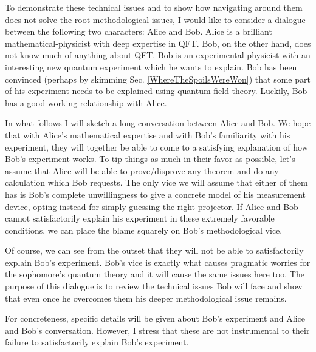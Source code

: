 \documentclass[12pt,prd,superscriptaddress,floatfix,amsmath,amssymb,amsfonts,nofootinbib]{revtex4-2}
\begin{document}
To demonstrate these technical issues and to show how navigating around them does not solve the root methodological issues, I would like to consider a dialogue between the following two characters: Alice and Bob. Alice is a brilliant mathematical-physicist with deep expertise in QFT. Bob, on the other hand, does not know much of anything about QFT. Bob is an experimental-physicist with an interesting new quantum experiment which he wants to explain. Bob has been convinced (perhaps by skimming Sec. \ref{WhereTheSpoilsWereWon}) that some part of his experiment needs to be explained using quantum field theory. Luckily, Bob has a good working relationship with Alice.

In what follows I will sketch a long conversation between Alice and Bob. We hope that with Alice's mathematical expertise and with Bob's familiarity with his experiment, they will together be able to come to a satisfying explanation of how Bob's experiment works. To tip things as much in their favor as possible, let's assume that Alice will be able to prove/disprove any theorem and do any calculation which Bob requests. The only vice we will assume that either of them has is Bob's complete unwillingness to give a concrete model of his measurement device, opting instead for simply guessing the right projector. If Alice and Bob cannot satisfactorily explain his experiment in these extremely favorable conditions, we can place the blame squarely on Bob's methodological vice.

Of course, we can see from the outset that they will not be able to satisfactorily explain Bob's experiment. Bob's vice is exactly what causes pragmatic worries for the sophomore's quantum theory and it will cause the same issues here too. The purpose of this dialogue is to review the technical issues Bob will face and show that even once he overcomes them his deeper methodological issue remains.

For concreteness, specific details will be given about Bob's experiment and Alice and Bob's conversation. However, I stress that these are not instrumental to their failure to satisfactorily explain Bob's experiment.

\end{document}
